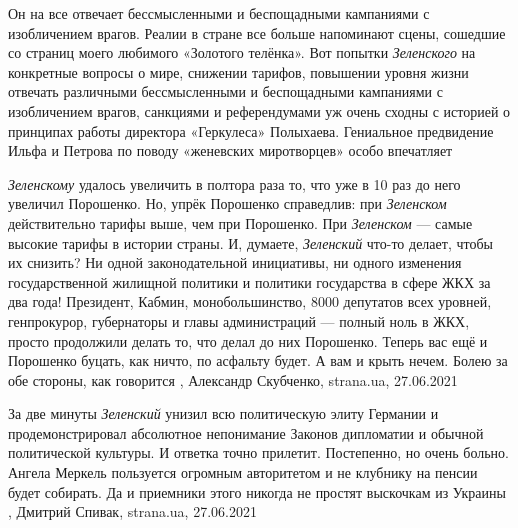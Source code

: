 Он на все отвечает бессмысленными и беспощадными кампаниями с изобличением
врагов.  Реалии в стране все больше напоминают сцены, сошедшие со страниц моего
любимого «Золотого телёнка». Вот попытки \emph{Зеленского} на конкретные вопросы о
мире, снижении тарифов, повышении уровня жизни отвечать различными
бессмысленными и беспощадными кампаниями с изобличением врагов, санкциями и
референдумами уж очень сходны с историей о принципах работы директора
«Геркулеса» Полыхаева.  Гениальное предвидение Ильфа и Петрова по поводу
«женевских миротворцев» особо впечатляет


\emph{Зеленскому} удалось увеличить в полтора раза то, что уже в 10 раз до него
увеличил Порошенко. Но, упрёк Порошенко справедлив: при \emph{Зеленском} действительно
тарифы выше, чем при Порошенко. При \emph{Зеленском} — самые высокие тарифы в истории
страны.  И, думаете, \emph{Зеленский} что-то делает, чтобы их снизить? Ни одной
законодательной инициативы, ни одного изменения государственной жилищной
политики и политики государства в сфере ЖКХ за два года! Президент, Кабмин,
монобольшинство, 8000 депутатов всех уровней, генпрокурор, губернаторы и главы
администраций — полный ноль в ЖКХ, просто продолжили делать то, что делал до
них Порошенко. Теперь вас ещё и Порошенко буцать, как ничто, по асфальту будет.
А вам и крыть нечем. Болею за обе стороны, как говорится
, 
Александр Скубченко, strana.ua, 27.06.2021

За две минуты \emph{Зеленский} унизил всю политическую элиту Германии и
продемонстрировал абсолютное непонимание Законов дипломатии и обычной
политической культуры.  И ответка точно прилетит. Постепенно, но очень больно.
Ангела Меркель пользуется огромным авторитетом и не клубнику на пенсии будет
собирать.  Да и приемники этого никогда не простят выскочкам из Украины
, 
Дмитрий Спивак, strana.ua, 27.06.2021


